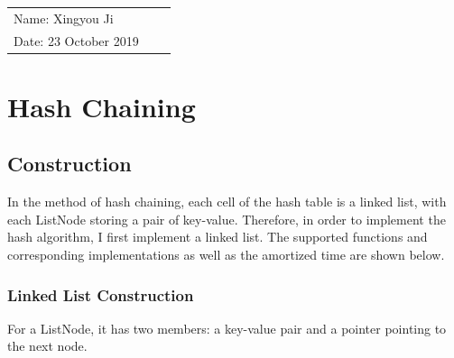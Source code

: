 \documentclass{article}
\begin{document}
\begin{spacing}{1.2}
\vspace*{0.25cm}

\thispagestyle{empty}

\begin{center}
\hrulefill

\thispagestyle{empty}


\begin{large}
\end{large}

\hrulefill

\vspace*{5cm}
\begin{Large}
\end{Large}

\vspace{2em}

\end{center}


\vfill

\begin{table}[h!]
\flushleft
\begin{tabular}{lll}
Name: Xingyou Ji \hspace*{2em}
\\
Date: 23 October 2019

\end{tabular}
\end{table}

\hfill

\newpage
\tableofcontents

\newpage
\section{Hash Chaining}
\subsection{Construction}
In the method of hash chaining, each cell of the hash table is a linked list, with each ListNode storing a pair of key-value. Therefore, in order to implement the hash algorithm, I first implement a linked list.
The supported functions and corresponding implementations as well as the amortized time are shown below.

\subsubsection{Linked List Construction}
For a ListNode, it has two members: a key-value pair and a pointer pointing to the next node.


\end{spacing}
\end{document}
